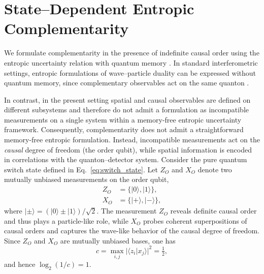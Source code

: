\documentclass[aps,pra,reprint,superscriptaddress]{revtex4-2}
\begin{document}
\section{State--Dependent Entropic Complementarity}
\label{sec:entr}

We formulate complementarity in the presence of indefinite causal order using the entropic uncertainty relation with quantum memory \cite{Berta2010}. In standard interferometric settings, entropic formulations of wave--particle duality can be expressed without quantum memory, since complementary observables act on the same quanton \cite{Coles2014}. 

In contrast, in the present setting spatial and causal observables are defined on different subsystems and therefore do not admit a formulation as incompatible measurements on a single system within a memory-free entropic uncertainty framework. Consequently, complementarity does not admit a straightforward memory-free entropic formulation. Instead, incompatible measurements act on the \emph{causal} degree of freedom (the order qubit), while spatial information is encoded in correlations with the quanton--detector system.
Consider the pure quantum switch state defined in Eq.~\eqref{eq:switch_state}. Let $Z_O$ and $X_O$ denote two mutually unbiased measurements on the order qubit,
\begin{align}
Z_O &= \{|0\rangle, |1\rangle\}, \\
X_O &= \{|+\rangle, |-\rangle\},
\end{align}
where $|\pm\rangle = (|0\rangle \pm |1\rangle)/\sqrt{2}$. 
The measurement $Z_O$ reveals definite causal order and thus plays a particle-like role, while $X_O$ probes coherent superpositions of causal orders and captures the wave-like behavior of the causal degree of freedom. Since $Z_O$ and $X_O$ are mutually unbiased bases, one has
\[
c = \max_{i,j} |\langle z_i | x_j \rangle|^2 = \tfrac{1}{2},
\]
and hence $\log_2(1/c) = 1$.
\end{document}
